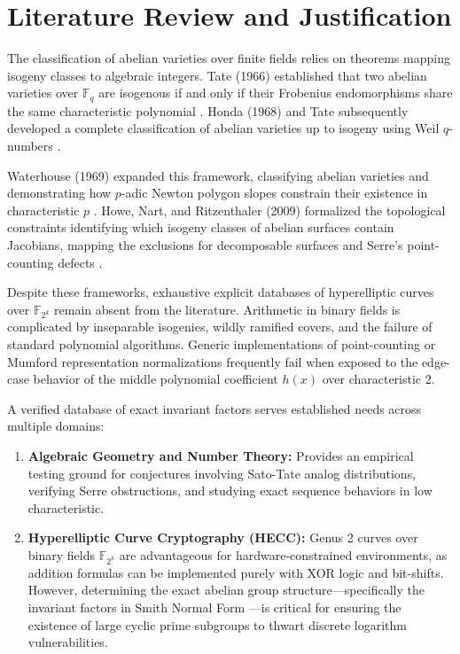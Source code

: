 \documentclass[12pt]{article}
\begin{document}
\section{Literature Review and Justification}
The classification of abelian varieties over finite fields relies on theorems mapping isogeny classes to algebraic integers. Tate (1966) established that two abelian varieties over $\mathbb{F}_q$ are isogenous if and only if their Frobenius endomorphisms share the same characteristic polynomial \cite{Tate1966}. Honda (1968) and Tate subsequently developed a complete classification of abelian varieties up to isogeny using Weil $q$-numbers \cite{Honda1968}. 

Waterhouse (1969) expanded this framework, classifying abelian varieties and demonstrating how $p$-adic Newton polygon slopes constrain their existence in characteristic $p$ \cite{Waterhouse1969}. Howe, Nart, and Ritzenthaler (2009) formalized the topological constraints identifying which isogeny classes of abelian surfaces contain Jacobians, mapping the exclusions for decomposable surfaces and Serre's point-counting defects \cite{Howe2009}. 

Despite these frameworks, exhaustive explicit databases of hyperelliptic curves over $\mathbb{F}_{2^k}$ remain absent from the literature. Arithmetic in binary fields is complicated by inseparable isogenies, wildly ramified covers, and the failure of standard polynomial algorithms. Generic implementations of point-counting or Mumford representation normalizations frequently fail when exposed to the edge-case behavior of the middle polynomial coefficient $h(x)$ over characteristic 2. 

A verified database of exact invariant factors serves established needs across multiple domains:
\begin{enumerate}
    \item \textbf{Algebraic Geometry and Number Theory:} Provides an empirical testing ground for conjectures involving Sato-Tate analog distributions, verifying Serre obstructions, and studying exact sequence behaviors in low characteristic.
    \item \textbf{Hyperelliptic Curve Cryptography (HECC):} Genus 2 curves over binary fields $\mathbb{F}_{2^k}$ are advantageous for hardware-constrained environments, as addition formulas can be implemented purely with XOR logic and bit-shifts. However, determining the exact abelian group structure---specifically the invariant factors in Smith Normal Form \cite{Smith1861}---is critical for ensuring the existence of large cyclic prime subgroups to thwart discrete logarithm vulnerabilities.
\end{enumerate}
\end{document}
